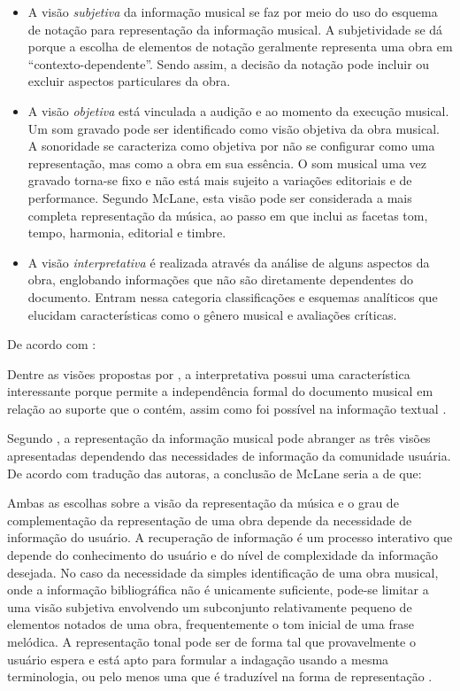 \begin{itemize}
    \item A visão \textit{subjetiva} da informação musical se faz por meio do uso do esquema de notação para representação da informação musical. A subjetividade se dá porque a escolha de elementos de notação geralmente representa uma obra em “contexto-dependente”. Sendo assim, a decisão da notação pode incluir ou excluir aspectos particulares da obra.
    \item A visão \textit{objetiva} está vinculada a audição e ao momento da execução musical. Um som gravado pode ser identificado como visão objetiva da obra musical. A sonoridade se caracteriza como objetiva por não se configurar como uma representação, mas como a obra em sua essência. O som musical uma vez gravado torna-se fixo e não está mais sujeito a variações editoriais e de performance. Segundo McLane, esta visão pode ser considerada a mais completa representação da música, ao passo em que inclui as facetas tom, tempo, harmonia, editorial e timbre.
    \item A visão \textit{interpretativa} é realizada através da análise de alguns aspectos da obra, englobando informações que não são diretamente dependentes do documento. Entram nessa categoria classificações e esquemas analíticos que elucidam características como o gênero musical e avaliações críticas.
\end{itemize}

De acordo com :

\begin{citacao}
Dentre as visões propostas por , a interpretativa possui uma característica interessante porque permite a independência formal do documento musical em relação ao suporte que o contém, assim como foi possível na informação textual \cite{cruz2014}.
\end{citacao}

Segundo , a representação da informação musical pode abranger as três visões apresentadas dependendo das necessidades de informação da comunidade usuária. De acordo com tradução das autoras, a conclusão de McLane seria a de que:

\begin{citacao}
Ambas as escolhas sobre a visão da representação da música e o grau de complementação da representação de uma obra depende da necessidade de informação do usuário. A recuperação de informação é um processo interativo que depende do conhecimento do usuário e do nível de complexidade da informação desejada. No caso da necessidade da simples identificação de uma obra musical, onde a informação bibliográfica não é unicamente suficiente, pode-se limitar a uma visão subjetiva envolvendo um subconjunto relativamente pequeno de elementos notados de uma obra, frequentemente o tom inicial de uma frase melódica. A representação tonal pode ser de forma tal que provavelmente o usuário espera e está apto para formular a indagação usando a mesma terminologia, ou pelo menos uma que é traduzível na forma de representação .
\end{citacao}

